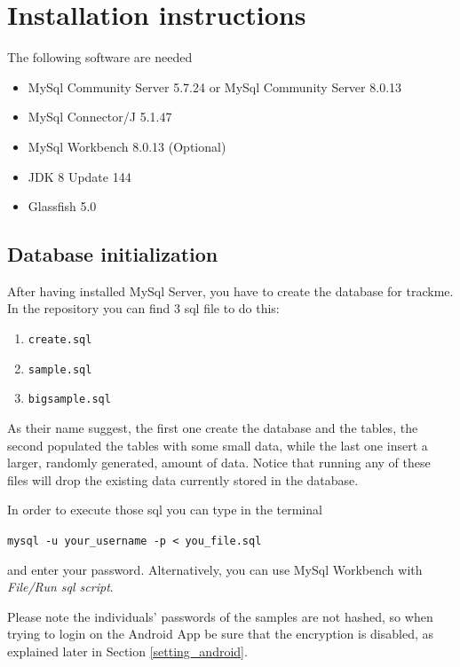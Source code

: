 \section{Installation instructions}
The following software are needed

\begin{itemize}
\item MySql Community Server  5.7.24 or MySql Community Server 8.0.13
\item MySql Connector/J 5.1.47
\item MySql Workbench 8.0.13 (Optional)
\item JDK 8 Update 144
\item Glassfish 5.0
\end{itemize}




\subsection{Database initialization}
After having installed MySql Server, you have to create the database for trackme.
In the repository you can find 3 sql file to do this:

\begin{enumerate}
\item \texttt{create.sql}
\item \texttt{sample.sql}
\item \texttt{bigsample.sql}
\end{enumerate}
As their name suggest, the first one create the database and the tables, the second populated the tables with some small data, while the last one insert a larger, randomly generated, amount of data.
Notice that running any of these files will drop the existing data currently stored in the database.
\vspace{1em}

\noindent
In order to execute those sql you can type in the terminal

\begin{center}
\texttt{mysql -u your\_username -p \textless\ you\_file.sql}
\end{center}
and enter your password.
Alternatively, you can use MySql Workbench with \textit{File/Run sql script}.
\vspace{1em}

\noindent
Please note the individuals' passwords of the samples are not hashed, so when trying to login on the Android App be sure that the encryption is disabled, as explained later in Section \ref{setting_android}.


